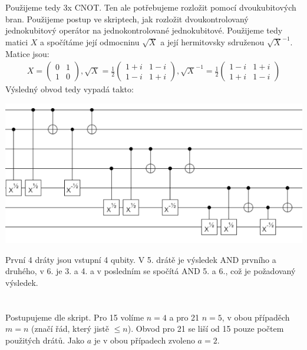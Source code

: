 \documentclass[12pt, a4paper]{article}
\begin{document}
Použijeme tedy 3x CNOT. Ten ale potřebujeme rozložit pomocí dvoukubitových bran. Použijeme postup ve skriptech, jak rozložit dvoukontrolovaný jednokubitový operátor na jednokontrolované jednokubitové. Použijeme tedy matici $X$ a spočítáme její odmocninu $\sqrt{X}$ a její hermitovsky sdruženou $\sqrt{X}^{-1}$. Matice jsou:
\begin{gather*}
X = \begin{pmatrix}
0 & 1\\
1 & 0
\end{pmatrix}, 
\sqrt{X} = \frac{1}{2}\begin{pmatrix}
1+i & 1-i\\
1-i & 1+i
\end{pmatrix},
\sqrt{X}^{-1} = \frac{1}{2}\begin{pmatrix}
1-i & 1+i\\
1+i & 1-i
\end{pmatrix}
\end{gather*}
Výsledný obvod tedy vypadá takto:
\begin{center}
\includegraphics{3/AND.png}
\end{center}

První 4 dráty jsou vstupní 4 qubity. V 5. drátě je výsledek AND prvního a druhého, v 6. je 3. a 4. a v posledním se spočítá AND 5. a 6., což je požadovaný výsledek.

\section{}
Postupujeme dle skript. Pro 15 volíme $n=4$ a pro 21 $n=5$, v obou případěch $m=n$ (značí řád, který jistě $\leq n$). Obvod pro 21 se liší od 15 pouze počtem použitých drátů. Jako $a$ je v obou případech zvoleno $a=2$.
\end{document}
